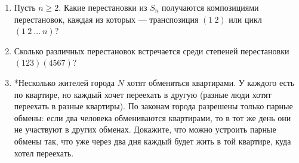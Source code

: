 \begin{enumerate}
\item Пусть $n\ge2$. Какие перестановки из $S_n$ получаются композициями перестановок, каждая из которых --- 
транспозиция $(1\ 2)$ или цикл $(1\ 2\ \ldots\ n)$?

\item  Сколько различных перестановок встречается среди степеней
перестановки $(123)(4567)$?

\item  *Несколько жителей города $N$ хотят обменяться квартирами. У
каждого есть по квартире, но каждый хочет переехать в другую
(разные люди хотят переехать в разные квартиры). По законам города
 разрешены только парные обмены: если два человека обмениваются
  квартирами, то в тот же день они не участвуют в других
обменах. Докажите, что можно устроить парные обмены так, что
уже через два дня каждый будет жить в той квартире, куда хотел
переехать.

\end{enumerate}






